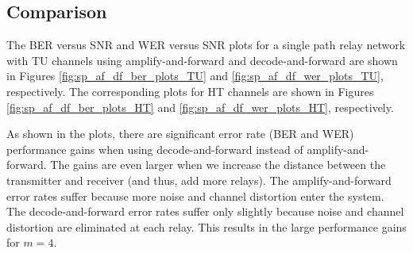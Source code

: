 \subsection{Comparison}
\label{subsec:sp_bws_c}

The BER versus SNR and WER versus SNR plots for a single path relay network with TU channels using amplify-and-forward and decode-and-forward are shown in Figures \ref{fig:sp_af_df_ber_plots_TU} and \ref{fig:sp_af_df_wer_plots_TU}, respectively.  The corresponding plots for HT channels are shown in Figures \ref{fig:sp_af_df_ber_plots_HT} and \ref{fig:sp_af_df_wer_plots_HT}, respectively.

As shown in the plots, there are significant error rate (BER and WER) performance gains when using decode-and-forward instead of amplify-and-forward.  The gains are even larger when we increase the distance between the transmitter and receiver (and thus, add more relays).  The amplify-and-forward error rates suffer because more noise and channel distortion enter the system.  The decode-and-forward error rates suffer only slightly because noise and channel distortion are eliminated at each relay.  This results in the large performance gains for $m=4$.

